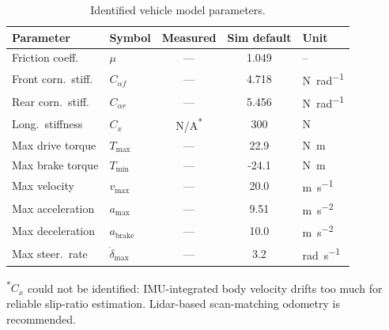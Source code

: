 \documentclass[11pt,a4paper]{article}
\begin{document}
\begin{table}[h]
\centering
\caption{Identified vehicle model parameters.}\label{tab:params}
\begin{tabular}{ll S[table-format=2.3] S[table-format=2.3] l}
\toprule
{Parameter} & {Symbol} & {Measured} & {Sim default} & {Unit} \\
\midrule
Friction coeff.      & $\mu$                    & {---} & 1.049  & {--}             \\
Front corn.\ stiff.  & $C_{\alpha f}$           & {---} & 4.718  & \si{\newton\per\radian} \\
Rear corn.\ stiff.   & $C_{\alpha r}$           & {---} & 5.456  & \si{\newton\per\radian} \\
Long.\ stiffness     & $C_x$                    & N/A\textsuperscript{*} & 300    & \si{\newton}     \\
Max drive torque     & $T_\text{max}$            & {---} & 22.9   & \si{\newton\metre}\\
Max brake torque     & $T_\text{min}$            & {---} & {-24.1}& \si{\newton\metre}\\
Max velocity         & $v_\text{max}$            & {---} & 20.0   & \si{\metre\per\second} \\
Max acceleration     & $a_\text{max}$            & {---} & 9.51   & \si{\metre\per\second\squared} \\
Max deceleration     & $a_\text{brake}$          & {---} & 10.0   & \si{\metre\per\second\squared} \\
Max steer.\ rate     & $\dot{\delta}_\text{max}$ & {---} & 3.2    & \si{\radian\per\second} \\
\bottomrule
\end{tabular}

\smallskip\noindent\textsuperscript{*}$C_x$ could not be identified:
IMU-integrated body velocity drifts too much for reliable slip-ratio
estimation.  Lidar-based scan-matching odometry is recommended.
\end{table}

\end{document}
